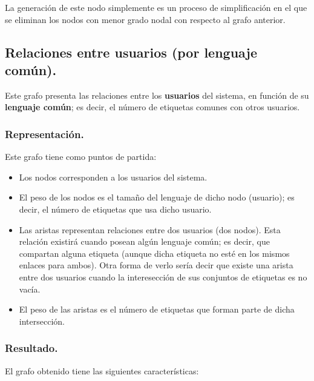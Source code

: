 La generación de este nodo simplemente es un proceso de simplificación en el que se eliminan los nodos con menor grado nodal con respecto al grafo anterior.





\subsection{Relaciones entre usuarios (por lenguaje común).}

Este grafo presenta las relaciones entre los {\bf usuarios} del sistema, en función de su {\bf lenguaje común}; es decir, el número de etiquetas comunes con otros usuarios.

\subsubsection{Representación.}

Este grafo tiene como puntos de partida:

\begin{itemize}
\item    Los nodos corresponden a los usuarios del sistema.
\item    El peso de los nodos es el tamaño del lenguaje de dicho nodo (usuario); es decir, el número de etiquetas que usa dicho usuario.
\item    Las aristas representan relaciones entre dos usuarios (dos nodos). Esta relación existirá cuando posean algún lenguaje común; es decir, que compartan alguna etiqueta (aunque dicha etiqueta no esté en los mismos enlaces para ambos). Otra forma de verlo sería decir que existe una arista entre dos usuarios cuando la interesección de sus conjuntos de etiquetas es no vacía.
\item    El peso de las aristas es el número de etiquetas que forman parte de dicha intersección.
\end{itemize}

\subsubsection{Resultado.}

El grafo obtenido tiene las siguientes características:


